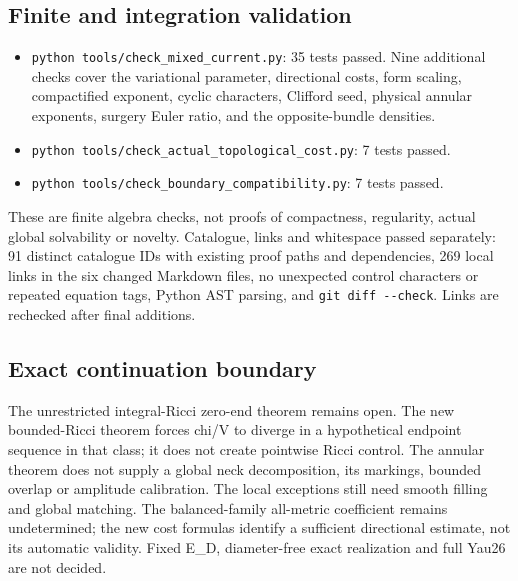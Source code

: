\documentclass[
  10pt,
]{article}
\providecommand{\tightlist}{%
  \setlength{\itemsep}{0pt}\setlength{\parskip}{0pt}}
\begin{document}
\hypertarget{finite-and-integration-validation}{%
\subsection{Finite and integration
validation}\label{finite-and-integration-validation}}

\begin{itemize}
\tightlist
\item
  \texttt{python\ tools/\nolinkurl{check_mixed_current.py}}: 35 tests passed. Nine
  additional checks cover the variational parameter, directional costs,
  form scaling, compactified exponent, cyclic characters, Clifford seed,
  physical annular exponents, surgery Euler ratio, and the
  opposite-bundle densities.
\item
  \texttt{python\ tools/\nolinkurl{check_actual_topological_cost.py}}: 7 tests
  passed.
\item
  \texttt{python\ tools/\nolinkurl{check_boundary_compatibility.py}}: 7 tests
  passed.
\end{itemize}

These are finite algebra checks, not proofs of compactness, regularity,
actual global solvability or novelty. Catalogue, links and whitespace
passed separately: 91 distinct catalogue IDs with existing proof paths
and dependencies, 269 local links in the six changed Markdown files, no
unexpected control characters or repeated equation tags, Python AST
parsing, and \texttt{git\ diff\ -\/-check}. Links are rechecked after
final additions.

\hypertarget{exact-continuation-boundary}{%
\subsection{Exact continuation
boundary}\label{exact-continuation-boundary}}

The unrestricted integral-Ricci zero-end theorem remains open. The new
bounded-Ricci theorem forces chi/V to diverge in a hypothetical endpoint
sequence in that class; it does not create pointwise Ricci control. The
annular theorem does not supply a global neck decomposition, its
markings, bounded overlap or amplitude calibration. The local exceptions
still need smooth filling and global matching. The balanced-family
all-metric coefficient remains undetermined; the new cost formulas
identify a sufficient directional estimate, not its automatic validity.
Fixed E\_D, diameter-free exact realization and full Yau26 are not
decided.
\end{document}

